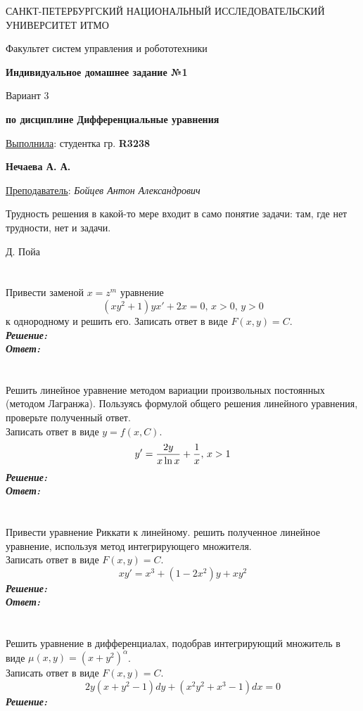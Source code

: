 \documentclass[a5paper, 10pt]{article}
\theoremstyle{definition}
\theoremstyle{plain}
\theoremstyle{remark}
\newcommand*{\titlePage}{
	\thispagestyle{title}
	\begingroup
	\begin{center}
		\vspace*{6ex}
		
		{\small
			САНКТ-ПЕТЕРБУРГСКИЙ НАЦИОНАЛЬНЫЙ ИССЛЕДОВАТЕЛЬСКИЙ УНИВЕРСИТЕТ ИТМО	
		}
		
		\vspace*{2ex}
		
		{\normalsize
			Факультет систем управления и робототехники
		}
		
		\vspace*{15ex}
		
		{\Large \bfseries 
			Индивидуальное домашнее задание №1
		}
\vspace*{3ex}
		
		{ \Large 
			Вариант 3
		}
\vspace*{3ex}
		
		{  \bfseries 
			по дисциплине Дифференциальные уравнения
		}
	\end{center}
	\vspace*{20ex}
	\begin{flushright}
		{\large 
			\underline{Выполнила}: студентка гр. \textbf{R3238}\\
			\begin{flushright}
				\textbf{Нечаева А. А.}\\
			\end{flushright}
		}
		
		\vspace*{5ex}
		
		{\large 
			\underline{Преподаватель}: \textit{Бойцев Антон Александрович}
		}
	\end{flushright}	
	\newpage
	\setcounter{page}{1}
	\endgroup}
\begin{document}
	\titlePage
	\pagestyle{style}
	
\newpage
\epigraph{Трудность решения в какой-то мере входит в само понятие задачи: там, где нет трудности, нет и задачи.}{Д. Пойа}

\section{}
Привести заменой $x=z^m$ уравнение 
\begin{equation*}
(xy^2+1)yx' + 2x = 0, \, x > 0, \, y > 0
\end{equation*}
к однородному и решить его. Записать ответ в виде $F(x, y) = C$.\\
\textit{\textbf{Решение:}}\\


\textit{\textbf{Ответ:}}

\newpage
\section{}
Решить линейное уравнение методом вариации произвольных постоянных (методом Лагранжа). Пользуясь формулой общего решения линейного уравнения, проверьте полученный ответ.\\
Записать ответ в виде $y = f(x, C).$
\begin{equation*}
y' = \frac{2y}{x \ln x} + \frac{1}{x}, \, x > 1\\
\end{equation*}
\textit{\textbf{Решение:}}\\


\textit{\textbf{Ответ:}}

\newpage
\section{}
Привести уравнение Риккати к линейному. решить полученное линейное уравнение, используя метод интегрирующего множителя.\\
Записать ответ в виде $F(x, y) = C$.
\begin{equation*}
xy' = x^3 + (1 - 2x^2)y + xy^2
\end{equation*}
\textit{\textbf{Решение:}}\\


\textit{\textbf{Ответ:}}


\newpage
\section{}
Решить уравнение в дифференциалах, подобрав интегрирующий множитель в виде $\mu (x, y) = (x+y^2)^{\alpha}$.\\
Записать ответ в виде $F(x, y) = C$.
\begin{equation*}
2y(x + y^2 - 1) dy + (x^2y^2+x^3 - 1)dx = 0
\end{equation*}
\textit{\textbf{Решение:}}\\
\end{document}
